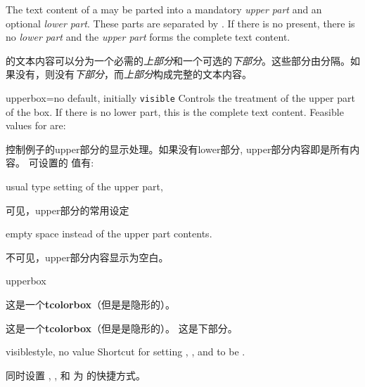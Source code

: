 The text content of a  may be parted into a mandatory \emph{upper part}
and an optional \emph{lower part}. These parts are separated by
. If there is no  present, there is no
\emph{lower part} and the \emph{upper part} forms the complete text content.


 的文本内容可以分为一个必需的\emph{上部分}和一个可选的\emph{下部分}。这些部分由分隔。如果没有，则没有\emph{下部分}，而\emph{上部分}构成完整的文本内容。

\begin{docTcbKey}[][doc new=2015-01-06]{upperbox}{=}{no default, initially \texttt{visible}}
Controls the treatment of the upper part of the box. If there is no lower part,  this is the complete text content.
Feasible values for  are:

控制例子的upper部分的显示处理。如果没有lower部分, upper部分内容即是所有内容。
可设置的  值有:
\begin{DescriptionL}{}
\item[\docValue{visible}]usual type setting of the upper part,
\par 可见，upper部分的常用设定
\item[\docValue{invisible}] empty space instead of the upper part contents.
\par 不可见，upper部分内容显示为空白。
\end{DescriptionL}
\begin{exdispExample}{upperbox}
\begin{tcolorbox}[upperbox=invisible,colback=white%
,title=upperbox设置为invisible且没有lower部分]
这是一个\textbf{tcolorbox}（但是是隐形的）。
\end{tcolorbox}

\begin{tcolorbox}[upperbox=invisible,colback=white%
,title=upperbox设置为invisible时只显示lower部分]
这是一个\textbf{tcolorbox}（但是是隐形的）。
\tcblower
这是下部分。
\end{tcolorbox}
\end{exdispExample}
\end{docTcbKey}


\begin{docTcbKey}[][doc new and updated={2015-01-06}{2019-03-01}]{visible}{}{style, no value}
Shortcut for setting , , and 
to be .

同时设置 , , 和  为  的快捷方式。
\end{docTcbKey}

